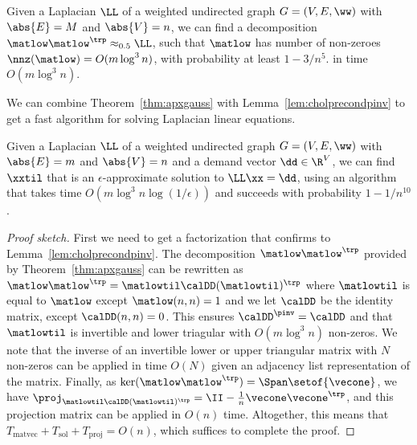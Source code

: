 \begin{theorem}
  \label{thm:apxgauss}
Given a Laplacian $\LL$ of a weighted undirected graph $G = (V,E,\ww)$
with $\abs{E}=M$ and $\abs{V} = n$,
we can find a decomposition
$\matlow\matlow^{\trp} \approx_{0.5} \LL $, such that
$\matlow$ has number of non-zeroes $\nnz(\matlow) = O(m \log^3 n)$,
with probability at least $1 - 3/n^{5}$.
in time  $O(m \log^3 n)$.
\end{theorem}
We can combine Theorem~\ref{thm:apxgauss} with
Lemma~\ref{lem:cholprecondpinv} to get a fast algorithm for solving
Laplacian linear equations.
\begin{corollary}
  \label{cor:precondsolver}
  Given a Laplacian $\LL$ of a weighted undirected graph $G = (V,E,\ww)$
with $\abs{E}=m$ and $\abs{V} = n$ and a demand vector $\dd \in \R^V$,
we can find $\xxtil$ that is an $\epsilon$-approximate solution to
$\LL \xx = \dd$, using an algorithm that takes time $O(m \log^3 n
\log(1/\epsilon))$ and succeeds with probability $1 - 1/n^{10}$.
\end{corollary}
\begin{proof}[Proof sketch]

  First we need to get a factorization that confirms to
  Lemma~\ref{lem:cholprecondpinv}.
  The decomposition $\matlow\matlow^{\trp}$ provided by
  Theorem~\ref{thm:apxgauss} can be rewritten as
  $\matlow\matlow^{\trp} = \matlowtil \calDD (\matlowtil)^{\trp}$
  where
$\matlowtil$ is equal to $\matlow$ except $\matlow(n,n) = 1$
and we let $\calDD$ be the identity matrix, except $\calDD (n,n)
= 0$.
This ensures $\calDD^{\pinv} = \calDD$ and that $\matlowtil$ is
invertible and lower triagular with  $O(m \log^3 n)$ non-zeros.
We note that the inverse of an invertible lower or upper triangular
  matrix with $N$ non-zeros can be applied in time $O(N)$ given an
  adjacency list representation of the matrix.
  Finally, as $\ker(\matlow\matlow^{\trp}) = \Span\setof{\vecone}$,
we have $\proj_{ \matlowtil \calDD (\matlowtil)^{\trp}}
= \II -\frac{1}{n} \vecone \vecone^{\trp}$, and this projection matrix can be
applied in $O(n)$ time.
Altogether, this means that $T_{\text{matvec}} + T_{\text{sol}} +
T_{\text{proj}} = O(n)$, which suffices to complete the proof.
\end{proof}

